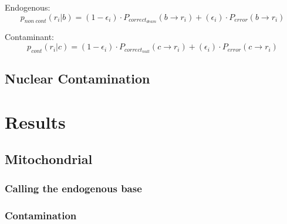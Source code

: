 \documentclass[a4paper,12pt]{article}
\begin{document}
\noindent Endogenous:
\begin{equation}
p_{non\ cont}(r_i|b) = (1-\epsilon_i ) \cdot  P_{correct_{deam}}( b \to r_i) +  (\epsilon_i) \cdot P_{error}(  b \to r_i )   
\end{equation}

\noindent Contaminant:
\begin{equation}
p_{cont}(r_i|c) = (1-\epsilon_i ) \cdot  P_{correct_{null}}( c \to r_i) +  (\epsilon_i) \cdot P_{error}(  c \to r_i )   
\end{equation}






\clearpage



\subsection{Nuclear Contamination}
\section{Results}

\subsection{Mitochondrial}


\subsubsection{Calling the endogenous base}
\subsubsection{Contamination}



{}

\end{document}
